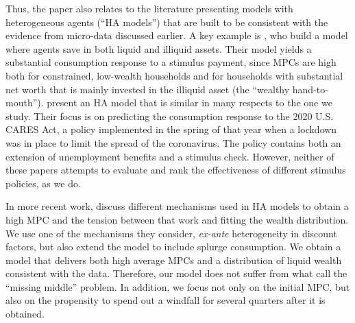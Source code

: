 \documentclass[\econtexRoot/HAFiscal]{subfiles}
\begin{document}
Thus, the paper also relates to the literature presenting models with heterogeneous agents (``HA models'') that are built to be consistent with the evidence from micro-data discussed earlier. A key example is \cite{kaplan2014model}, who build a model where agents save in both liquid and illiquid assets. Their model yields a substantial consumption response to a stimulus payment, since MPCs are high both for constrained, low-wealth households and for households with substantial net worth that is mainly invested in the illiquid asset (the ``wealthy hand-to-mouth''). \cite{carroll2020modeling} present an HA model that is similar in many respects to the one we study. Their focus is on predicting the consumption response to the 2020 U.S. CARES Act, a policy implemented in the spring of that year when a lockdown was in place to limit the spread of the coronavirus. The policy contains both an extension of unemployment benefits and a stimulus check. However, neither of these papers attempts to evaluate and rank the effectiveness of different stimulus policies, as we do.

In more recent work, \cite{kaplanMPC2022} discuss different mechanisms used in HA models to obtain a high MPC and the tension between that work and fitting the wealth distribution. We use one of the mechanisms they consider, \textit{ex-ante} heterogeneity in discount factors, but also extend the model to include splurge consumption. We obtain a model that delivers both high average MPCs and a distribution of liquid wealth consistent with the data. Therefore, our model does not suffer from what \cite{kaplanMPC2022} call the ``missing middle'' problem. In addition, we focus not only on the initial MPC, but also on the propensity to spend out a windfall for several quarters after it is obtained. 
\end{document}
